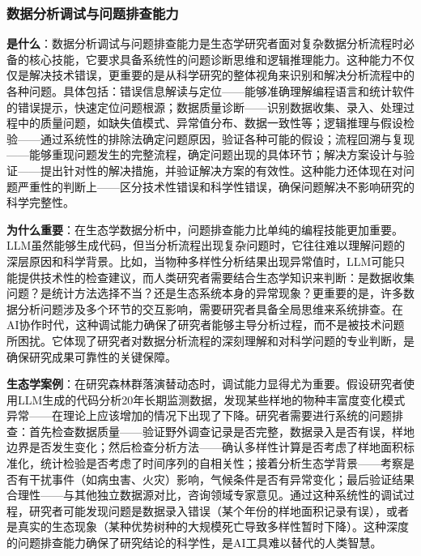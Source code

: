 \documentclass[
]{book}
\begin{document}
\hypertarget{ux6570ux636eux5206ux6790ux8c03ux8bd5ux4e0eux95eeux9898ux6392ux67e5ux80fdux529b}{%
\subsubsection{数据分析调试与问题排查能力}\label{ux6570ux636eux5206ux6790ux8c03ux8bd5ux4e0eux95eeux9898ux6392ux67e5ux80fdux529b}}

\textbf{是什么}：数据分析调试与问题排查能力是生态学研究者面对复杂数据分析流程时必备的核心技能，它要求具备系统性的问题诊断思维和逻辑推理能力。这种能力不仅仅是解决技术错误，更重要的是从科学研究的整体视角来识别和解决分析流程中的各种问题。具体包括：错误信息解读与定位------能够准确理解编程语言和统计软件的错误提示，快速定位问题根源；数据质量诊断------识别数据收集、录入、处理过程中的质量问题，如缺失值模式、异常值分布、数据一致性等；逻辑推理与假设检验------通过系统性的排除法确定问题原因，验证各种可能的假设；流程回溯与复现------能够重现问题发生的完整流程，确定问题出现的具体环节；解决方案设计与验证------提出针对性的解决措施，并验证解决方案的有效性。这种能力还体现在对问题严重性的判断上------区分技术性错误和科学性错误，确保问题解决不影响研究的科学完整性。

\textbf{为什么重要}：在生态学数据分析中，问题排查能力比单纯的编程技能更加重要。LLM虽然能够生成代码，但当分析流程出现复杂问题时，它往往难以理解问题的深层原因和科学背景。比如，当物种多样性分析结果出现异常值时，LLM可能只能提供技术性的检查建议，而人类研究者需要结合生态学知识来判断：是数据收集问题？是统计方法选择不当？还是生态系统本身的异常现象？更重要的是，许多数据分析问题涉及多个环节的交互影响，需要研究者具备全局思维来系统排查。在AI协作时代，这种调试能力确保了研究者能够主导分析过程，而不是被技术问题所困扰。它体现了研究者对数据分析流程的深刻理解和对科学问题的专业判断，是确保研究成果可靠性的关键保障。

\textbf{生态学案例}：在研究森林群落演替动态时，调试能力显得尤为重要。假设研究者使用LLM生成的代码分析20年长期监测数据，发现某些样地的物种丰富度变化模式异常------在理论上应该增加的情况下出现了下降。研究者需要进行系统的问题排查：首先检查数据质量------验证野外调查记录是否完整，数据录入是否有误，样地边界是否发生变化；然后检查分析方法------确认多样性计算是否考虑了样地面积标准化，统计检验是否考虑了时间序列的自相关性；接着分析生态学背景------考察是否有干扰事件（如病虫害、火灾）影响，气候条件是否有异常变化；最后验证结果合理性------与其他独立数据源对比，咨询领域专家意见。通过这种系统性的调试过程，研究者可能发现问题是数据录入错误（某个年份的样地面积记录有误），或者是真实的生态现象（某种优势树种的大规模死亡导致多样性暂时下降）。这种深度的问题排查能力确保了研究结论的科学性，是AI工具难以替代的人类智慧。
\end{document}
